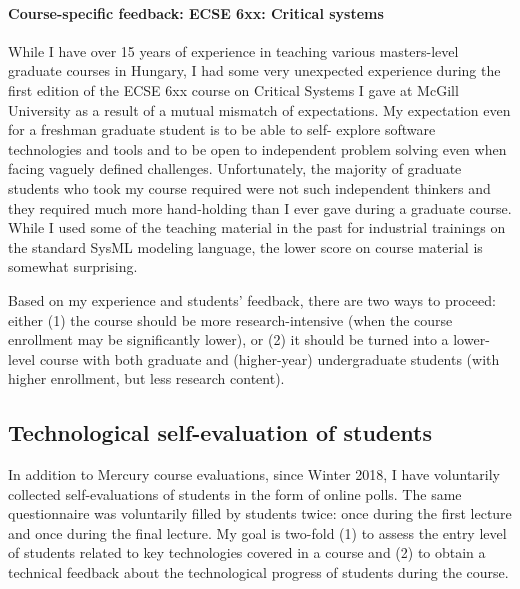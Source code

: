 \documentclass[a4paper,11pt]{report}
\begin{document}
\paragraph{Course-specific feedback: ECSE 6xx: Critical systems}
While I have over 15 years of experience in teaching various masters-level graduate courses in Hungary, I had some very 
unexpected experience during the first edition of the ECSE 6xx course on Critical Systems I gave at McGill University as a 
result of a mutual mismatch of expectations. My expectation even for a freshman graduate student is to be able to self-
explore software technologies and tools and to be open to independent problem solving even when facing vaguely defined 
challenges. Unfortunately, the majority of graduate students who took my course required were not such independent 
thinkers and they required much more hand-holding than I ever gave during a graduate course. While I used some of the 
teaching material in the past for industrial trainings on the standard SysML modeling language, the lower score on 
course material is somewhat surprising.

Based on my experience and students' feedback, there are two ways to proceed: either (1) the course should be more research-intensive (when the course enrollment may be significantly lower), or (2) it should be turned into a lower-level course with both graduate and (higher-year) undergraduate students (with higher enrollment, but less research content). 




\subsection{Technological self-evaluation of students}
\label{sec:tech-self-eval}
In addition to Mercury course evaluations, since Winter 2018, I have voluntarily collected self-evaluations of students in the form of online polls. The same questionnaire was voluntarily filled by students twice: once during the first lecture and once during the final lecture. My goal is two-fold (1) to assess the entry level of students related to key technologies covered in a course and (2) to obtain a technical feedback about the technological progress of students during the course. 
\end{document}
